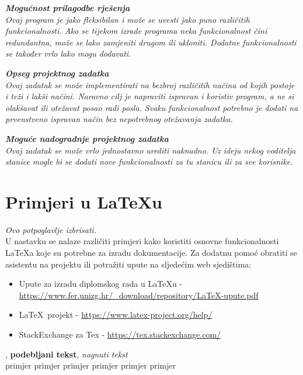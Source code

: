		\textbf{\textit{Mogućnost prilagodbe rješenja}}\\
		\textit{Ovaj program je jako fleksibilan i može se uvesti jako puno različitih funkcionalnosti. Ako se tijekom izrade programa neka funkcionalnost čini redundantna, može se lako zamjeniti drugom ili ukloniti. Dodatne funkcionalnosti se također vrlo lako mogu dodavati.}
		
		\textbf{\textit{Opseg projektnog zadatka}}\\
		\textit{Ovaj zadatak se može implementirati na bezbroj različitih načina od kojih postoje i teži i lakši načini. Naravno cilj je napraviti ispravan i koristiv program, a ne si olakšavat ili otežavat posao radi posla. Svaku funkcionalnost potrebno je dodati na prvenstveno ispravan način bez nepotrebnog otežavanja zadatka.}
		
		\textbf{\textit{Moguće nadogradnje projektnog zadatka}}\\
		\textit{Ovaj zadatak se može vrlo jednostavno urediti naknadno. Uz ideju nekog voditelja stanice mogle bi se dodati nove funkcionalnosti za tu stanicu ili za sve korisnike.}
		
		
		\eject
		
		
		
		\section{Primjeri u \LaTeX u}
		
		\textit{Ovo potpoglavlje izbrisati.}\\

		U nastavku se nalaze različiti primjeri kako koristiti osnovne funkcionalnosti \LaTeX a koje su potrebne za izradu dokumentacije. Za dodatnu pomoć obratiti se asistentu na projektu ili potražiti upute na sljedećim web sjedištima:
		\begin{itemize}
			\item Upute za izradu diplomskog rada u \LaTeX u - \url{https://www.fer.unizg.hr/_download/repository/LaTeX-upute.pdf}
			\item \LaTeX\ projekt - \url{https://www.latex-project.org/help/}
			\item StackExchange za Tex - \url{https://tex.stackexchange.com/}\\
		
		\end{itemize} 	


		
		\noindent {}, \textbf{podebljani tekst}, 	\textit{nagnuti tekst}\\
		\noindent \normalsize primjer \large primjer \Large primjer \LARGE {primjer} \huge {primjer} \Huge primjer \normalsize
				
